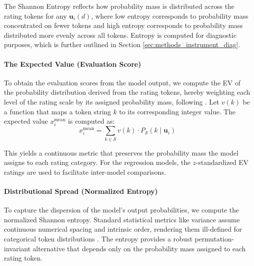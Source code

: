 The Shannon Entropy reflects how probability mass is distributed across the rating tokens for any $\mathbf{u}_i(d)$, where low entropy corresponds to probability mass concentrated on fewer tokens and high entropy corresponds to probability mass distributed more evenly across all tokens. Entropy is computed for diagnostic purposes, which is further outlined in Section \ref{sec:methods_instrument_diag}. 




\paragraph{The Expected Value (Evaluation Score)}

To obtain the evaluation scores from the model output, we compute the EV of the probability distribution derived from the rating tokens, hereby weighting each level of the rating scale by its assigned probability mass, following \citet{liu_g-eval_2023}. Let $v(k)$ be a function that maps a token string $k$ to its corresponding integer value. The expected value $x_i^{\text{mean}}$ is computed as:
\begin{equation}\label{eq:weighted_score}
    x_i^{\text{mean}} = \sum_{k \in \mathcal{S}} v(k) \cdot P_{\mathcal{S}}(k \mid \mathbf{u}_i)
\end{equation}

This yields a continuous metric that preserves the probability mass the model assigns to each rating category. For the regression models, the $z$-standardized EV ratings are used to facilitate inter-model comparisons.



\paragraph{Distributional Spread (Normalized Entropy)}

To capture the dispersion of the model's output probabilities, we compute the normalized Shannon entropy. Standard statistical metrics like variance assume continuous numerical spacing and intrinsic order, rendering them ill-defined for categorical token distributions \citep{ali_entropy-lens_2025}. The entropy provides a robust permutation-invariant alternative that depends only on the probability mass assigned to each rating token. 

